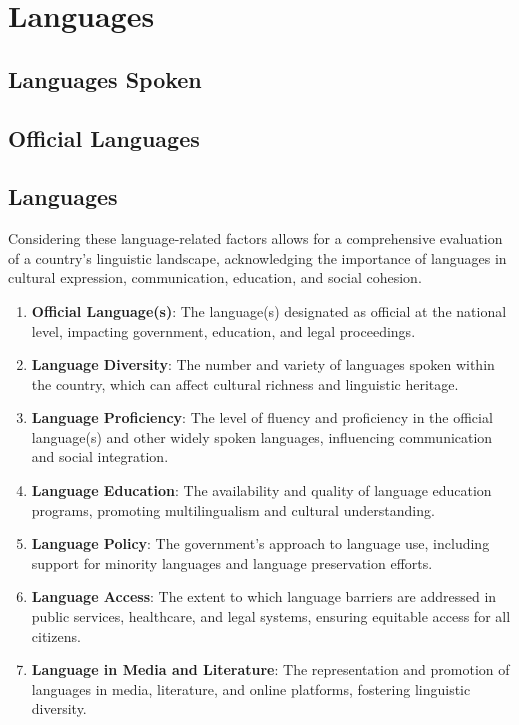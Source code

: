 \section{Languages}

\subsection{Languages Spoken}

\subsection{Official Languages}

\subsection{Languages}
Considering these language-related factors allows for a
comprehensive evaluation of a country's linguistic landscape,
acknowledging the importance of languages in cultural expression,
communication, education, and social cohesion.
\begin{enumerate}
  \item \textbf{Official Language(s)}: The language(s) designated
  as official at the national level, impacting government,
  education, and legal proceedings.
  
  \item \textbf{Language Diversity}: The number and variety of
  languages spoken within the country, which can affect cultural
  richness and linguistic heritage.
  
  \item \textbf{Language Proficiency}: The level of fluency and
  proficiency in the official language(s) and other widely spoken
  languages, influencing communication and social integration.
  
  \item \textbf{Language Education}: The availability and quality
  of language education programs, promoting multilingualism and
  cultural understanding.
  
  \item \textbf{Language Policy}: The government's approach to
  language use, including support for minority languages and
  language preservation efforts.
  
  \item \textbf{Language Access}: The extent to which language
  barriers are addressed in public services, healthcare, and
  legal systems, ensuring equitable access for all citizens.
  
  \item \textbf{Language in Media and Literature}: The
  representation and promotion of languages in media,
  literature, and online platforms, fostering linguistic
  diversity.
  
\end{enumerate}


